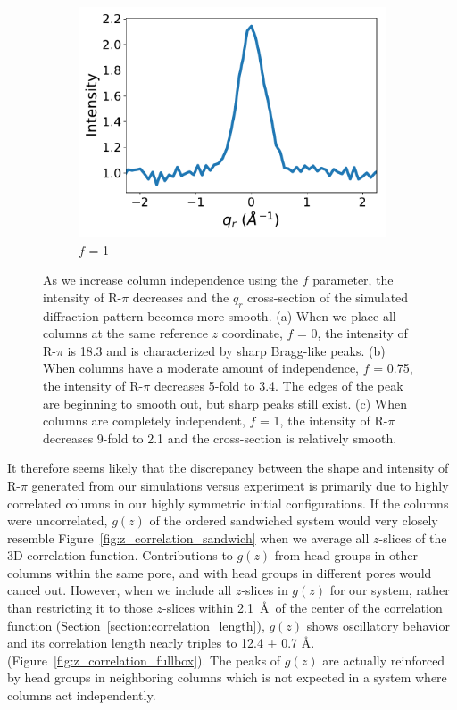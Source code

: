 \documentclass[journal=jpcbfk,manuscript=article]{achemso}
\begin{document}
\begin{figure}
  \begin{subfigure}{0.325\textwidth}
  \includegraphics[width=\textwidth]{sf_qy_sr100.pdf}
  \caption{$f$ = 1}\label{fig:sf_qy_sr100}
  \end{subfigure}
  \caption{As we increase column independence using the $f$ parameter, the
	  intensity of R-$\pi$ decreases and the $q_r$ cross-section of the simulated
	  diffraction pattern becomes more smooth.  (a) When we place all columns at the
	  same reference $z$ coordinate, $f$ = 0, the intensity of R-$\pi$ is 18.3 and is
	  characterized by sharp Bragg-like peaks. (b) When columns have a moderate
	  amount of independence, $f$ = 0.75, the intensity of R-$\pi$ decreases 5-fold
	  to 3.4. The edges of the peak are beginning to smooth out, but sharp peaks
	  still exist. (c) When columns are completely independent, $f$ = 1, the
	  intensity of R-$\pi$ decreases 9-fold to 2.1 and the cross-section is
          relatively smooth.}\label{fig:column_displacement}
  \end{figure}

  It therefore seems likely that the discrepancy between the shape and intensity of
  R-$\pi$ generated from our simulations versus experiment is primarily due to
  highly correlated columns in our highly symmetric initial configurations.
  If the columns were uncorrelated, $g(z)$ of the ordered sandwiched system 
  would very closely resemble Figure~\ref{fig:z_correlation_sandwich} when we 
  average all $z$-slices of the 3D correlation function. Contributions to
  $g(z)$ from head groups in other columns within the same pore, and with head
  groups in different pores would cancel out. However, when we include all 
  $z$-slices in $g(z)$ for our system, rather than restricting it to those 
  $z$-slices within 2.1~\AA~of the center of the correlation function 
  (Section~\ref{section:correlation_length}), $g(z)$ shows oscillatory 
  behavior and its correlation length nearly triples to 12.4 $\pm$ 0.7 \AA.
  (Figure~\ref{fig:z_correlation_fullbox}). The peaks of $g(z)$ are actually 
  reinforced by head groups in neighboring columns which is not expected
  in a system where columns act independently.
\end{document}
